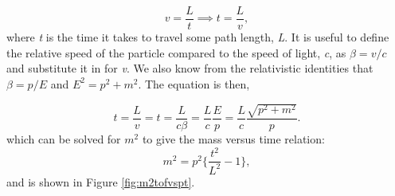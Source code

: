 \begin{equation}
v=\frac{L}{t} \implies t=\frac{L}{v},
\end{equation}
where \textit{t} is the time it takes to travel some path length, \textit{L}. It is useful to define the relative speed of the particle compared to the speed of light, \textit{c}, as $\beta = v/c$ and substitute it in for \textit{v}. We also know from the relativistic identities that $\beta = p/E$ and $E^{2} = p^{2} + m^{2}$. The equation is then, 

\begin{equation} \label{eqn:qmomentum}
t=\frac{L}{v} = t=\frac{L}{c\beta} = \frac{L}{c} \frac{E}{p} = \frac{L}{c} \frac{\sqrt{p^{2} + m^{2}}}{p}.
\end{equation}
which can be solved for $m^{2}$ to give the mass versus time relation:
\begin{equation} \label{eqn:m2tof}
m^{2} = p^{2} \bigg\{ \frac{t^{2}}{L^{2}} -1 \bigg\},
\end{equation}
and is shown in Figure \ref{fig:m2tofvspt}.

